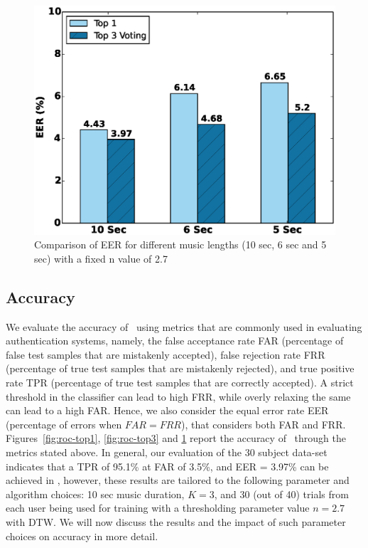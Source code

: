 \begin{figure}[t]
\centering
\includegraphics [width=\columnwidth]{figure/exp2_vary_length.eps}
\caption{Comparison of EER for different music lengths (10 sec, 6 sec and 5 
sec) with a fixed n value of 2.7}
\label{fig:eer-length}
\end{figure}


\subsection{Accuracy}
We evaluate the accuracy of \systemname~using metrics that are commonly used 
in evaluating authentication systems, namely,
the false acceptance rate FAR (percentage of false test samples that are 
mistakenly accepted), false rejection rate FRR (percentage of true test 
samples that are mistakenly rejected), and true positive rate 
TPR (percentage of true test samples that are correctly accepted). 
A strict threshold in the classifier can lead to high FRR, while 
overly relaxing the same can lead to a high FAR. Hence, we also consider 
the equal error rate EER (percentage of errors when $FAR = FRR$), that 
considers both FAR and FRR.
Figures~\ref{fig:roc-top1}, \ref{fig:roc-top3} and \ref{fig:eer-length} report 
the accuracy 
of \systemname~through the metrics stated above. 
In general, our evaluation of the 30 subject data-set indicates that a 
TPR of 95.1\% at FAR of 3.5\%, and EER = 3.97\% can be achieved in 
\systemname, however, these results are tailored to the following parameter 
and algorithm choices:
10 sec music duration, $K = 3$, and 30 (out of 40) trials from each user being 
used for training with a thresholding parameter value $n = 2.7$ with DTW. 
We will now discuss the results and the impact of such parameter choices 
on accuracy in more detail.
